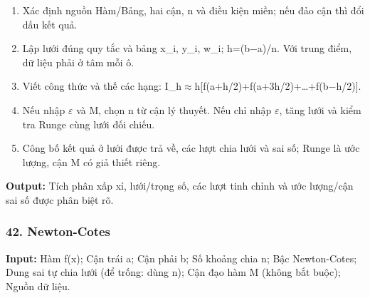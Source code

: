 \begin{enumerate}

\item Xác định nguồn Hàm/\allowbreak{}Bảng,\allowbreak{} hai cận,\allowbreak{} n và điều kiện miền;\allowbreak{} nếu đảo cận thì đổi dấu kết quả.

\item Lập lưới đúng quy tắc và bảng x\_i,\allowbreak{} y\_i,\allowbreak{} w\_i;\allowbreak{} h=\allowbreak{}(\allowbreak{}b\ensuremath{-}a)/\allowbreak{}n. Với trung điểm,\allowbreak{} dữ liệu phải ở tâm mỗi ô.

\item Viết công thức và thế các hạng: I\_h\ensuremath{\approx}h[f(\allowbreak{}a+\allowbreak{}h/\allowbreak{}2)+\allowbreak{}f(\allowbreak{}a+\allowbreak{}3h/\allowbreak{}2)+\allowbreak{}…+\allowbreak{}f(\allowbreak{}b\ensuremath{-}h/\allowbreak{}2)].

\item Nếu nhập \ensuremath{\varepsilon} và M,\allowbreak{} chọn n từ cận lý thuyết. Nếu chỉ nhập \ensuremath{\varepsilon},\allowbreak{} tăng lưới và kiểm tra Runge cùng lưới đối chiếu.

\item Công bố kết quả ở lưới được trả về,\allowbreak{} các lượt chia lưới và sai số;\allowbreak{} Runge là ước lượng,\allowbreak{} cận M có giả thiết riêng.

\end{enumerate}

\textbf{Output:} Tích phân xấp xỉ,\allowbreak{} lưới/\allowbreak{}trọng số,\allowbreak{} các lượt tinh chỉnh và ước lượng/\allowbreak{}cận sai số được phân biệt rõ.

\examplebreak\subsubsection*{42. Newton-Cotes}

\textbf{Input:} Hàm f(\allowbreak{}x);\allowbreak{} Cận trái a;\allowbreak{} Cận phải b;\allowbreak{} Số khoảng chia n;\allowbreak{} Bậc Newton-Cotes;\allowbreak{} Dung sai tự chia lưới (\allowbreak{}để trống: dùng n);\allowbreak{} Cận đạo hàm M (\allowbreak{}không bắt buộc);\allowbreak{} Nguồn dữ liệu.

